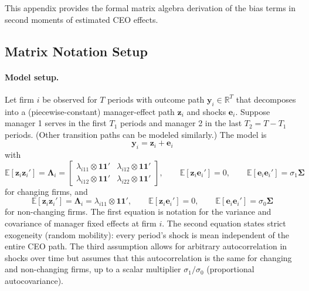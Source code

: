 \documentclass[11pt,a4paper]{article}
\begin{document}
This appendix provides the formal matrix algebra derivation of the bias terms in second moments of estimated CEO effects.

\subsection{Matrix Notation Setup}

\paragraph{Model setup.} Let firm $i$ be observed for $T$ periods with outcome path $\mathbf y_i\in\mathbb R^T$ that decomposes into a (piecewise-constant) manager-effect path $\mathbf z_i$ and shocks $\mathbf e_i$. Suppose manager 1 serves in the first $T_1$ periods and manager 2 in the last $T_2=T-T_1$ periods. (Other transition paths can be modeled similarly.) The model is
\begin{equation}
\mathbf y_i = \mathbf z_i + \mathbf e_i
\end{equation}
with 
\begin{equation}
\mathbb E[\mathbf z_i\mathbf z_i']= \mathbf \Lambda_i=
\begin{bmatrix}
  \lambda_{i11}\otimes \mathbf{11}' & \lambda_{i12}\otimes \mathbf{11}'\\
  \lambda_{i12}\otimes \mathbf{11}' & \lambda_{i22}\otimes \mathbf{11}'
\end{bmatrix},
\qquad \mathbb E[\mathbf z_i\mathbf e_i']=0,
\qquad \mathbb E[\mathbf e_i\mathbf e_i']=\sigma_1\mathbf\Sigma
\end{equation}
for changing firms, and 
\begin{equation}
\mathbb E[\mathbf z_i\mathbf z_i']= \mathbf \Lambda_i=
  \lambda_{i11}\otimes \mathbf{11}',
\qquad \mathbb E[\mathbf z_i\mathbf e_i']=0,
\qquad \mathbb E[\mathbf e_i\mathbf e_i']=\sigma_0\mathbf\Sigma
\end{equation}
for non-changing firms. The first equation is notation for the variance and covariance of manager fixed effects at firm $i$. The second equation states strict exogeneity (random mobility): every period's shock is mean independent of the entire CEO path. The third assumption allows for arbitrary autocorrelation in shocks over time but assumes that this autocorrelation is the same for changing and non-changing firms, up to a scalar multiplier $\sigma_1/\sigma_0$ (proportional autocovariance).
\end{document}

